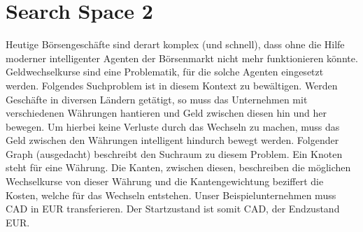 \documentclass[DIV=12,numbers=noenddot]{scrartcl}
\begin{document}
\section{Search Space 2}
Heutige Börsengeschäfte sind derart komplex (und schnell), dass ohne die Hilfe moderner intelligenter Agenten der Börsenmarkt nicht mehr funktionieren könnte. Geldwechselkurse sind eine Problematik, für die solche Agenten eingesetzt werden. Folgendes Suchproblem ist in diesem Kontext zu bewältigen. Werden Geschäfte in diversen Ländern getätigt, so muss das Unternehmen mit verschiedenen Währungen hantieren und Geld zwischen diesen hin und her bewegen. Um hierbei keine Verluste durch das Wechseln zu machen, muss das Geld zwischen den Währungen intelligent hindurch bewegt werden. Folgender Graph (ausgedacht) beschreibt den Suchraum zu diesem Problem. Ein Knoten steht für eine Währung. Die Kanten, zwischen diesen, beschreiben die möglichen Wechselkurse von dieser Währung und die Kantengewichtung beziffert die Kosten, welche für das Wechseln entstehen. Unser Beispielunternehmen muss CAD in EUR transferieren. Der Startzustand ist somit CAD, der Endzustand EUR.
\begin{figure}[h!]
	\centering
	\def\svgwidth{\columnwidth}
	
\end{figure}
\end{document}
